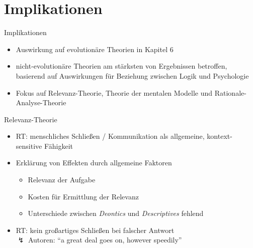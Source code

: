 
\section{Implikationen}

\begin{frame}{Implikationen {\scriptsize \cite[S.~112-113]{stenningHumanReasoningCognitive2008}}}
    \begin{itemize}
        \item Auswirkung auf evolutionäre Theorien  in Kapitel 6
        \item nicht-evolutionäre Theorien am stärksten von Ergebnissen betroffen,
            basierend auf Auswirkungen für Beziehung zwischen Logik und Psychologie
        \item Fokus auf Relevanz-Theorie, Theorie der mentalen Modelle und Rationale-Analyse-Theorie
    \end{itemize}
\end{frame}


\begin{frame}{Relevanz-Theorie {\scriptsize \cite[S.~113-114]{stenningHumanReasoningCognitive2008}}}
    \begin{itemize}
        \item RT: menschliches Schließen / Kommunikation als allgemeine, kontext-sensitive Fähigkeit
        \item Erklärung von Effekten durch allgemeine Faktoren
        \begin{itemize}
            \item Relevanz der Aufgabe
            \item Kosten für Ermittlung der Relevanz
            \item Unterschiede zwischen \emph{Deontics} und \emph{Descriptives} fehlend
        \end{itemize}
        \item RT: kein großartiges Schließen bei falscher Antwort \\
            $\lightning$ Autoren: \enquote{a great deal goes on, however speedily}
    \end{itemize}
\end{frame}


